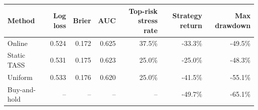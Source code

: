 \begin{tabular}{lrrrrrr}
\toprule
Method & Log loss & Brier & AUC & Top-risk stress rate & Strategy return & Max drawdown \\
\midrule
Online & 0.524 & 0.172 & 0.625 & 37.5\% & -33.3\% & -49.5\% \\
Static TASS & 0.531 & 0.175 & 0.623 & 25.0\% & -25.0\% & -48.3\% \\
Uniform & 0.533 & 0.176 & 0.620 & 25.0\% & -41.5\% & -55.1\% \\
Buy-and-hold & -- & -- & -- & -- & -49.7\% & -65.1\% \\
\bottomrule
\end{tabular}
